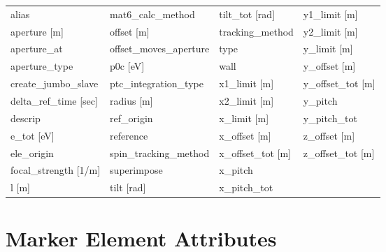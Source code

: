  \begin{tabular}{llll} \toprule
alias                          & mat6_calc_method               & tilt_tot [rad]                 & y1_limit [m]                   \\
aperture [m]                   & offset [m]                     & tracking_method                & y2_limit [m]                   \\
aperture_at                    & offset_moves_aperture          & type                           & y_limit [m]                    \\
aperture_type                  & p0c [eV]                       & wall                           & y_offset [m]                   \\
create_jumbo_slave             & ptc_integration_type           & x1_limit [m]                   & y_offset_tot [m]               \\
delta_ref_time [sec]           & radius [m]                     & x2_limit [m]                   & y_pitch                        \\
descrip                        & ref_origin                     & x_limit [m]                    & y_pitch_tot                    \\
e_tot [eV]                     & reference                      & x_offset [m]                   & z_offset [m]                   \\
ele_origin                     & spin_tracking_method           & x_offset_tot [m]               & z_offset_tot [m]               \\
focal_strength [1/m]           & superimpose                    & x_pitch                        &                                \\
l [m]                          & tilt [rad]                     & x_pitch_tot                    &                                \\
 \bottomrule
 \end{tabular}
 \vfill
 
 \section{Marker Element Attributes}
 \label{s:list.marker}
 
